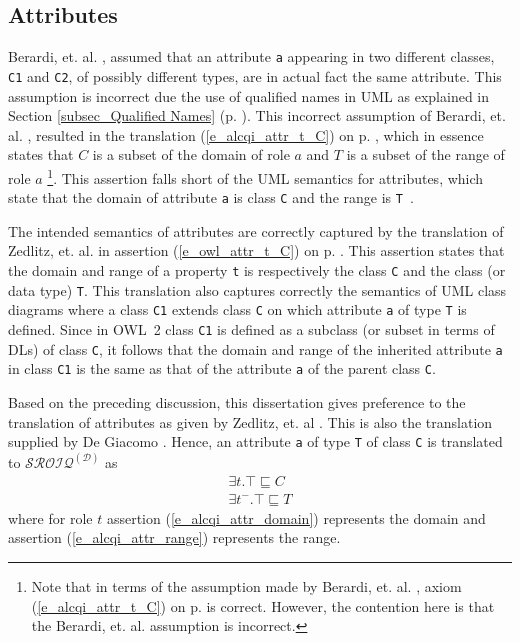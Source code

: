 \subsection{Attributes} \label{sec_attributes_sroiq}
Berardi, et. al. \cite{Berardi2005}, assumed that an attribute \texttt{a} appearing in two different
classes, \texttt{C1} and \texttt{C2}, of possibly different types, are in actual fact the same 
attribute. This assumption is incorrect due the use of qualified names in UML as explained 
in Section \ref{subsec_Qualified Names} (p. \pageref{subsec_Qualified Names}). This 
incorrect assumption of Berardi, et. al. \cite{Berardi2005}, resulted in the translation 
(\ref{e_alcqi_attr_t_C}) on p. \pageref{e_alcqi_attr_t_C}, which in essence states
that $C$ is a subset of the domain of role $a$ and $T$ is a subset of the range of role $a$
\footnote{Note that in terms of the assumption made by Berardi, et. al. \cite{Berardi2005}, axiom
(\ref{e_alcqi_attr_t_C}) on p. \pageref{e_alcqi_attr_t_C} is correct. However, the contention here is that the Berardi, et. al. \cite{Berardi2005} 
assumption is incorrect.}.
This assertion falls short of the UML semantics for attributes, which state
that the domain of attribute \texttt{a} is class \texttt{C} and the range is 
\texttt{T}~\cite{ISO-UMLSuper2.4.1}. 

The intended semantics of attributes are correctly captured 
by the translation of Zedlitz, et. al.
in assertion (\ref{e_owl_attr_t_C}) on p. \pageref{e_owl_attr_t_C} \cite{Zedlitz2012}.
This assertion states that the domain and range of a property \texttt{t} is respectively the class \texttt{C}
and the class (or data type) \texttt{T}. This translation also captures correctly the semantics of UML 
class diagrams
where a class \texttt{C1} extends class \texttt{C} on which attribute \texttt{a} of type \texttt{T} 
is defined. Since in OWL~2 class \texttt{C1} is defined as a subclass (or subset in terms of DLs) of 
class \texttt{C}, it follows that the domain and range of the inherited 
attribute \texttt{a} in class \texttt{C1} is the same as that of the attribute \texttt{a} of the parent
class \texttt{C}.

Based on the preceding discussion, this dissertation gives preference to the translation of 
attributes as given by Zedlitz, et. al \cite{Zedlitz2012}.
This is also the translation supplied by De Giacomo \cite{DeGiacomoPresentation}. 
Hence, an attribute \texttt{a} of type \texttt{T} of class \texttt{C} is translated to  
$\mathcal{SROIQ}^{(\mathcal{D})}$ as
    \begin{align} 
      \exists t.\top \sqsubseteq C \label{e_alcqi_attr_domain} \\
      \exists t^-.\top \sqsubseteq T \label{e_alcqi_attr_range}
    \end{align}
where for role $t$ assertion (\ref{e_alcqi_attr_domain}) represents the domain 
and assertion (\ref{e_alcqi_attr_range}) represents the range.

